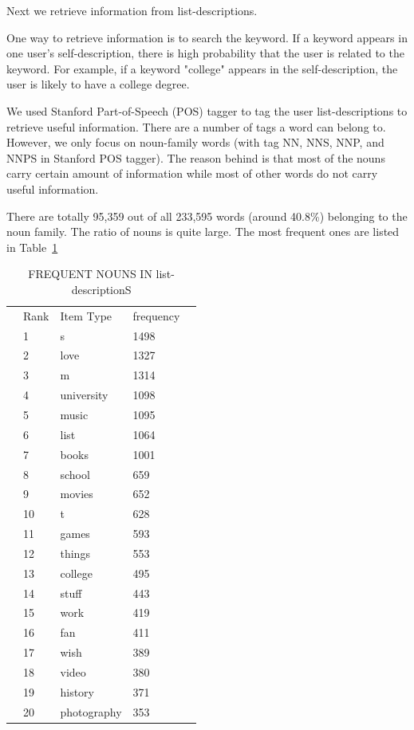 \documentclass{llncs}
\begin{document}
Next we retrieve information from list-descriptions. 

One way to retrieve information is to search the keyword. If a keyword appears in one user's self-description, there is high probability that the user is related to the keyword. For example, if a keyword "college" appears in the self-description, the user is likely to have a college degree. 

We used Stanford Part-of-Speech (POS) tagger \cite{toutanova2003feature} to tag the user list-descriptions to retrieve useful information. There are a number of tags a word can belong to. However, we only focus on noun-family words (with tag NN, NNS, NNP, and NNPS in Stanford POS tagger). The reason behind is that most of the nouns carry certain amount of information while most of other words do not carry useful information. 

There are totally 95,359 out of all 233,595 words (around 40.8\%) belonging to the noun family. The ratio of nouns is quite large. The most frequent ones are listed in Table~\ref{tb:freq}

\begin{table}[!ht]
\centering
\caption{FREQUENT NOUNS IN list-descriptionS}
\label{tb:freq}
\begin{tabular}{p{3cm}p{3cm}p{3cm}p{3cm}p{3cm}}
 & Rank & Item Type & frequency & \\
 & 1 & s & 1498 &  \\
 & 2 & love & 1327 &  \\
 & 3 & m & 1314 &  \\
 & 4 & university & 1098 &  \\
 & 5 & music & 1095 &  \\
 & 6 & list & 1064 &  \\
 & 7 & books & 1001 &  \\
 & 8 & school & 659 &  \\
 & 9 & movies & 652 &  \\
 & 10 & t & 628 &  \\
 & 11 & games & 593 &  \\
 & 12 & things & 553 &  \\
 & 13 & college & 495 &  \\
 & 14 & stuff & 443 &  \\
 & 15 & work & 419 &  \\
 & 16 & fan & 411 &  \\
 & 17 & wish & 389 &  \\
 & 18 & video & 380 &  \\
 & 19 & history & 371 &  \\
 & 20 & photography & 353 &  \\
\end{tabular}
\end{table}
\end{document}
